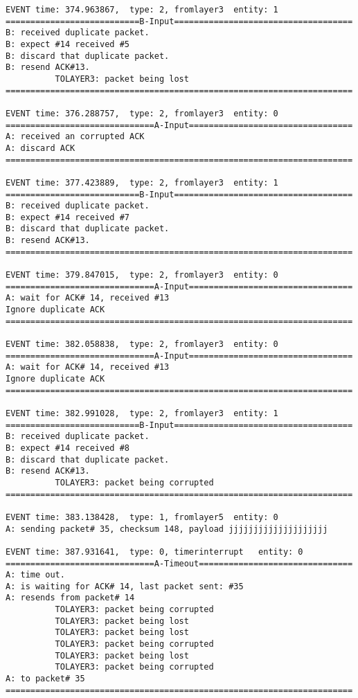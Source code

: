 \documentclass[12pt]{article}
\begin{document}
\begin{verbatim}
EVENT time: 374.963867,  type: 2, fromlayer3  entity: 1
===========================B-Input====================================
B: received duplicate packet.
B: expect #14 received #5
B: discard that duplicate packet.
B: resend ACK#13.
          TOLAYER3: packet being lost
======================================================================

EVENT time: 376.288757,  type: 2, fromlayer3  entity: 0
==============================A-Input=================================
A: received an corrupted ACK 
A: discard ACK
======================================================================

EVENT time: 377.423889,  type: 2, fromlayer3  entity: 1
===========================B-Input====================================
B: received duplicate packet.
B: expect #14 received #7
B: discard that duplicate packet.
B: resend ACK#13.
======================================================================

EVENT time: 379.847015,  type: 2, fromlayer3  entity: 0
==============================A-Input=================================
A: wait for ACK# 14, received #13
Ignore duplicate ACK
======================================================================

EVENT time: 382.058838,  type: 2, fromlayer3  entity: 0
==============================A-Input=================================
A: wait for ACK# 14, received #13
Ignore duplicate ACK
======================================================================

EVENT time: 382.991028,  type: 2, fromlayer3  entity: 1
===========================B-Input====================================
B: received duplicate packet.
B: expect #14 received #8
B: discard that duplicate packet.
B: resend ACK#13.
          TOLAYER3: packet being corrupted
======================================================================

EVENT time: 383.138428,  type: 1, fromlayer5  entity: 0
A: sending packet# 35, checksum 148, payload jjjjjjjjjjjjjjjjjjjj

EVENT time: 387.931641,  type: 0, timerinterrupt   entity: 0
==============================A-Timeout===============================
A: time out. 
A: is waiting for ACK# 14, last packet sent: #35
A: resends from packet# 14 
          TOLAYER3: packet being corrupted
          TOLAYER3: packet being lost
          TOLAYER3: packet being lost
          TOLAYER3: packet being corrupted
          TOLAYER3: packet being lost
          TOLAYER3: packet being corrupted
A: to packet# 35
======================================================================


\end{verbatim}
\end{document}
